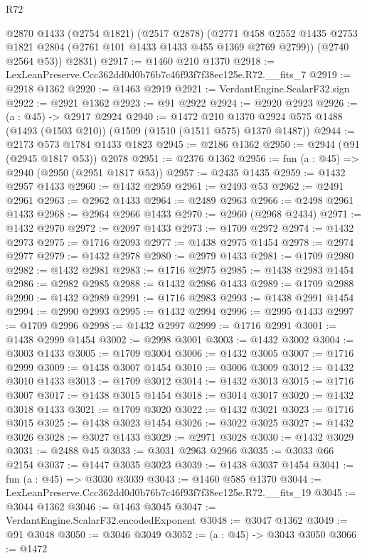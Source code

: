\begin{lexlean}{R72}
\begin{coremodule}
        @2870
        @1433
        (@2754 @1821)
        (@2517 @2878)
        (@2771 @458 @2552 @1435 @2753 @1821 @2804 (@2761 @101 @1433 @1433 @455 @1369 @2769 @2799))
        (@2740 @2564 @53))
      @2831)
@2917 := @1460 @210 @1370
@2918 := LexLeanPreserve.Ccc362dd0d0b76b7c46f93f7f38ec125e.R72.__fits_7
@2919 := @2918 @1362
@2920 := @1463 @2919
@2921 := VerdantEngine.ScalarF32.sign
@2922 := @2921 @1362
@2923 := @91 @2922
@2924 := @2920 @2923
@2926 := (a : @45) -> @2917 @2924
@2940 := @1472
    @210
    @1370
    @2924
    @575
    @1488
    (@1493 (@1503 @210))
    (@1509 (@1510 (@1511 @575) @1370 @1487))
@2944 := @2173 @573 @1784 @1433 @1823
@2945 := @2186 @1362
@2950 := @2944 (@91 (@2945 @1817 @53)) @2078
@2951 := @2376 @1362
@2956 := fun (a : @45) => @2940 (@2950 (@2951 @1817 @53))
@2957 := @2435 @1435
@2959 := @1432 @2957 @1433
@2960 := @1432 @2959
@2961 := @2493 @53
@2962 := @2491 @2961
@2963 := @2962 @1433
@2964 := @2489 @2963
@2966 := @2498 @2961 @1433
@2968 := @2964 @2966 @1433
@2970 := @2960 (@2968 @2434)
@2971 := @1432 @2970
@2972 := @2097 @1433
@2973 := @1709 @2972
@2974 := @1432 @2973
@2975 := @1716 @2093
@2977 := @1438 @2975 @1454
@2978 := @2974 @2977
@2979 := @1432 @2978
@2980 := @2979 @1433
@2981 := @1709 @2980
@2982 := @1432 @2981
@2983 := @1716 @2975
@2985 := @1438 @2983 @1454
@2986 := @2982 @2985
@2988 := @1432 @2986 @1433
@2989 := @1709 @2988
@2990 := @1432 @2989
@2991 := @1716 @2983
@2993 := @1438 @2991 @1454
@2994 := @2990 @2993
@2995 := @1432 @2994
@2996 := @2995 @1433
@2997 := @1709 @2996
@2998 := @1432 @2997
@2999 := @1716 @2991
@3001 := @1438 @2999 @1454
@3002 := @2998 @3001
@3003 := @1432 @3002
@3004 := @3003 @1433
@3005 := @1709 @3004
@3006 := @1432 @3005
@3007 := @1716 @2999
@3009 := @1438 @3007 @1454
@3010 := @3006 @3009
@3012 := @1432 @3010 @1433
@3013 := @1709 @3012
@3014 := @1432 @3013
@3015 := @1716 @3007
@3017 := @1438 @3015 @1454
@3018 := @3014 @3017
@3020 := @1432 @3018 @1433
@3021 := @1709 @3020
@3022 := @1432 @3021
@3023 := @1716 @3015
@3025 := @1438 @3023 @1454
@3026 := @3022 @3025
@3027 := @1432 @3026
@3028 := @3027 @1433
@3029 := @2971 @3028
@3030 := @1432 @3029
@3031 := @2488 @45
@3033 := @3031 @2963 @2966
@3035 := @3033 @66 @2154
@3037 := @1447 @3035 @3023
@3039 := @1438 @3037 @1454
@3041 := fun (a : @45) => @3030 @3039
@3043 := @1460 @585 @1370
@3044 := LexLeanPreserve.Ccc362dd0d0b76b7c46f93f7f38ec125e.R72.__fits_19
@3045 := @3044 @1362
@3046 := @1463 @3045
@3047 := VerdantEngine.ScalarF32.encodedExponent
@3048 := @3047 @1362
@3049 := @91 @3048
@3050 := @3046 @3049
@3052 := (a : @45) -> @3043 @3050
@3066 := @1472

\end{coremodule}
\end{lexlean}
